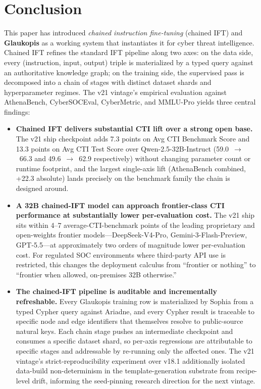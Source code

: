 \documentclass[webpdf,contemporary,large]{oup-authoring-template}
\theoremstyle{thmstyleone}
\theoremstyle{thmstyletwo}
\theoremstyle{thmstylethree}
\begin{document}
\section{Conclusion}

This paper has introduced \textit{chained instruction fine-tuning} (chained IFT) and \textbf{Glaukopis} as a working system that instantiates it for cyber threat intelligence. Chained IFT refines the standard IFT pipeline along two axes: on the data side, every (instruction, input, output) triple is materialized by a typed query against an authoritative knowledge graph; on the training side, the supervised pass is decomposed into a chain of stages with distinct dataset shards and hyperparameter regimes. The v21 vintage's empirical evaluation against AthenaBench, CyberSOCEval, CyberMetric, and MMLU-Pro yields three central findings:

\begin{itemize}
  \item \textbf{Chained IFT delivers substantial CTI lift over a strong open base.} The v21 ship checkpoint adds 7.3 points on Avg CTI Benchmark Score and 13.3 points on Avg CTI Test Score over Qwen-2.5-32B-Instruct (59.0~$\to$~66.3 and 49.6~$\to$~62.9 respectively) without changing parameter count or runtime footprint, and the largest single-axis lift (AthenaBench combined, +22.3 absolute) lands precisely on the benchmark family the chain is designed around.
  \item \textbf{A 32B chained-IFT model can approach frontier-class CTI performance at substantially lower per-evaluation cost.} The v21 ship sits within 4--7 average-CTI-benchmark points of the leading proprietary and open-weights frontier models---DeepSeek-V4-Pro, Gemini-3-Flash-Preview, GPT-5.5---at approximately two orders of magnitude lower per-evaluation cost. For regulated SOC environments where third-party API use is restricted, this changes the deployment calculus from ``frontier or nothing'' to ``frontier when allowed, on-premises 32B otherwise.''
  \item \textbf{The chained-IFT pipeline is auditable and incrementally refreshable.} Every Glaukopis training row is materialized by Sophia from a typed Cypher query against Ariadne, and every Cypher result is traceable to specific node and edge identifiers that themselves resolve to public-source natural keys. Each chain stage pushes an intermediate checkpoint and consumes a specific dataset shard, so per-axis regressions are attributable to specific stages and addressable by re-running only the affected ones. The v21 vintage's strict-reproducibility experiment over v18.1 additionally isolated data-build non-determinism in the template-generation substrate from recipe-level drift, informing the seed-pinning research direction for the next vintage.
\end{itemize}
\end{document}
